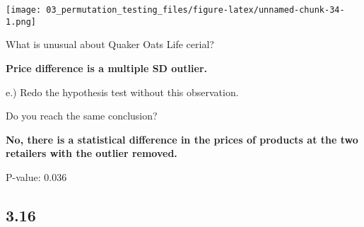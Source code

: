 \documentclass[
  12pt,
]{report}
\newenvironment{Shaded}{\begin{snugshade}}{\end{snugshade}}
\newcommand{\ControlFlowTok}[1]{\textcolor[rgb]{0.13,0.29,0.53}{\textbf{#1}}}
\newcommand{\DataTypeTok}[1]{\textcolor[rgb]{0.13,0.29,0.53}{#1}}
\newcommand{\DecValTok}[1]{\textcolor[rgb]{0.00,0.00,0.81}{#1}}
\newcommand{\FloatTok}[1]{\textcolor[rgb]{0.00,0.00,0.81}{#1}}
\newcommand{\KeywordTok}[1]{\textcolor[rgb]{0.13,0.29,0.53}{\textbf{#1}}}
\newcommand{\NormalTok}[1]{#1}
\newcommand{\OperatorTok}[1]{\textcolor[rgb]{0.81,0.36,0.00}{\textbf{#1}}}
\newcommand{\StringTok}[1]{\textcolor[rgb]{0.31,0.60,0.02}{#1}}
\begin{document}
\texttt{[image: 03\_permutation\_testing\_files/figure-latex/unnamed-chunk-34-1.png]}

What is unusual about Quaker Oats Life cerial?

\textbf{Price difference is a multiple SD outlier.}

e.) Redo the hypothesis test without this observation.

\begin{Shaded}
\end{Shaded}

Do you reach the same conclusion?

\textbf{No, there is a statistical difference in the prices of products
at the two retailers with the outlier removed.}

P-value: 0.036

\hypertarget{section-15}{%
\subsection{3.16}\label{section-15}}
\end{document}

